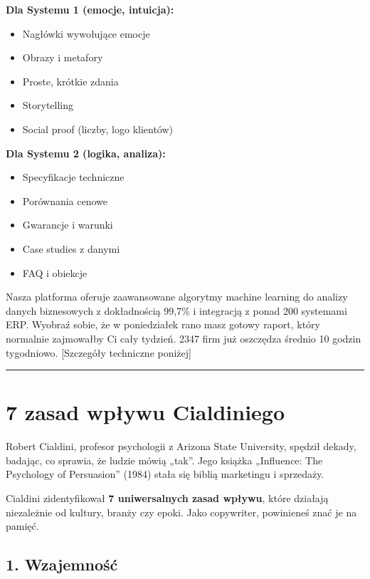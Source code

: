 \documentclass[
  12pt,
  a4paper,
  twoside,
  openright,
  12pt,
  DIV=12,
  BCOR=12mm]{scrbook}
\providecommand{\tightlist}{%
  \setlength{\itemsep}{0pt}\setlength{\parskip}{0pt}}\usepackage{longtable,booktabs,array}
\newcommand{\decoline}{%
  \begin{center}
    \textcolor{bordergray}{\rule{0.3\textwidth}{0.5pt}}
  \end{center}
}
\begin{document}
\textbf{Dla Systemu 1 (emocje, intuicja):}

\begin{itemize}
\tightlist
\item
  Nagłówki wywołujące emocje
\item
  Obrazy i metafory
\item
  Proste, krótkie zdania
\item
  Storytelling
\item
  Social proof (liczby, logo klientów)
\end{itemize}

\textbf{Dla Systemu 2 (logika, analiza):}

\begin{itemize}
\tightlist
\item
  Specyfikacje techniczne
\item
  Porównania cenowe
\item
  Gwarancje i warunki
\item
  Case studies z danymi
\item
  FAQ i obiekcje
\end{itemize}

\begin{beforeafter}
{Nasza platforma oferuje zaawansowane algorytmy machine learning do analizy danych biznesowych z dokładnością 99,7\% i integracją z ponad 200 systemami ERP.}
{Wyobraź sobie, że w poniedziałek rano masz gotowy raport, który normalnie zajmowałby Ci cały tydzień. 2347 firm już oszczędza średnio 10 godzin tygodniowo. [Szczegóły techniczne poniżej]}
\end{beforeafter}

\decoline

\section{7 zasad wpływu Cialdiniego}\label{zasad-wpux142ywu-cialdiniego}

Robert Cialdini, profesor psychologii z Arizona State University,
spędził dekady, badając, co sprawia, że ludzie mówią „tak''. Jego
książka „Influence: The Psychology of Persuasion'' (1984) stała się
biblią marketingu i sprzedaży.

Cialdini zidentyfikował \textbf{7 uniwersalnych zasad wpływu}, które
działają niezależnie od kultury, branży czy epoki. Jako copywriter,
powinieneś znać je na pamięć.

\subsection{1. Wzajemność}\label{wzajemnoux15bux107}
\end{document}
